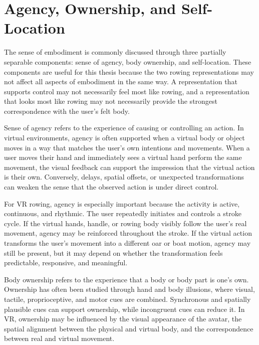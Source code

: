\section{Agency, Ownership, and Self-Location}
\label{sec:background_agency_ownership_self_location}

The sense of embodiment is commonly discussed through three partially separable components: sense of agency, body ownership, and self-location. These components are useful for this thesis because the two rowing representations may not affect all aspects of embodiment in the same way. A representation that supports control may not necessarily feel most like rowing, and a representation that looks most like rowing may not necessarily provide the strongest correspondence with the user's felt body.

Sense of agency refers to the experience of causing or controlling an action. In virtual environments, agency is often supported when a virtual body or object moves in a way that matches the user's own intentions and movements. When a user moves their hand and immediately sees a virtual hand perform the same movement, the visual feedback can support the impression that the virtual action is their own. Conversely, delays, spatial offsets, or unexpected transformations can weaken the sense that the observed action is under direct control.

For VR rowing, agency is especially important because the activity is active, continuous, and rhythmic. The user repeatedly initiates and controls a stroke cycle. If the virtual hands, handle, or rowing body visibly follow the user's real movement, agency may be reinforced throughout the stroke. If the virtual action transforms the user's movement into a different oar or boat motion, agency may still be present, but it may depend on whether the transformation feels predictable, responsive, and meaningful.

Body ownership refers to the experience that a body or body part is one's own. Ownership has often been studied through hand and body illusions, where visual, tactile, proprioceptive, and motor cues are combined. Synchronous and spatially plausible cues can support ownership, while incongruent cues can reduce it. In VR, ownership may be influenced by the visual appearance of the avatar, the spatial alignment between the physical and virtual body, and the correspondence between real and virtual movement.

